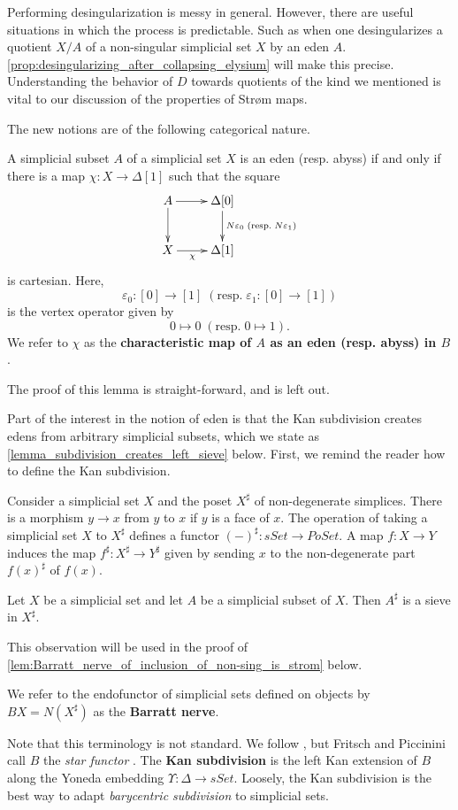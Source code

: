 Performing desingularization is messy in general. However, there are useful situations in which the process is predictable. Such as when one desingularizes a quotient $X/A$ of a non-singular simplicial set $X$ by an eden $A$. \cref{prop:desingularizing_after_collapsing_elysium} will make this precise. Understanding the behavior of $D$ towards quotients of the kind we mentioned is vital to our discussion of the properties of Str\o m maps.

The new notions are of the following categorical nature.
\begin{lemma}\label{lem:(co)sieve_characterization_categorical}
A simplicial subset $A$ of a simplicial set $X$ is an eden (resp. abyss) if and only if there is a map
$\chi :X\rightarrow \Delta [1]$ such that the square
\begin{displaymath}
 \xymatrix{
 A \ar[d] \ar[r] & \Delta [0] \ar[d]^{N\varepsilon _0\; (\textrm{resp.} \; N\varepsilon _1)} \\
 X \ar[r]_(.45)\chi & \Delta [1]
 }
\end{displaymath}
is cartesian. Here,
\[\varepsilon _0:[0]\to [1]\; (\textrm{resp.} \; \varepsilon _1:[0]\to [1])\]
is the vertex operator given by
\[0\mapsto 0\; (\textrm{resp.} \; 0\mapsto 1).\]
We refer to $\chi$ as the \textbf{characteristic map of $A$ as an eden (resp. abyss) in $B$}.
\end{lemma}
\noindent The proof of this lemma is straight-forward, and is left out.

Part of the interest in the notion of eden is that the Kan subdivision creates edens from arbitrary simplicial subsets, which we state as \cref{lemma_subdivision_creates_left_sieve} below. First, we remind the reader how to define the Kan subdivision.

Consider a simplicial set $X$ and the poset $X^\sharp$ of non-degenerate simplices. There is a morphism $y\to x$ from $y$ to $x$ if $y$ is a face of $x$. The operation of taking a simplicial set $X$ to $X^\sharp$ defines a functor $(-)^\sharp :sSet\to PoSet$.  A map $f:X\to Y$ induces the map $f^\sharp :X^\sharp \to Y^\sharp$ given by sending $x$ to the non-degenerate part $f(x)^\sharp$ of $f(x)$.
\begin{lemma}\label{lem:sharp_creates_sieves}
Let $X$ be a simplicial set and let $A$ be a simplicial subset of $X$. Then $A^\sharp$ is a sieve in $X^\sharp$.
\end{lemma}
\noindent This observation will be used in the proof of \cref{lem:Barratt_nerve_of_inclusion_of_non-sing_is_strom} below.
\begin{definition}\label{def:Barratt_nerve}
We refer to the endofunctor of simplicial sets defined on objects by $BX=N(X^\sharp )$ as the \textbf{Barratt nerve}.
\end{definition}
\noindent Note that this terminology is not standard. We follow \cite[Def.~2.2.3, p.~35]{WJR13}, but Fritsch and Piccinini call $B$ the \emph{star functor} \cite[Exercise~4.6.33,~p.~219]{FP90}. The \textbf{Kan subdivision} is the left Kan extension of $B$ along the Yoneda embedding $\Upsilon :\Delta \to sSet$. Loosely, the Kan subdivision is the best way to adapt \emph{barycentric subdivision} to simplicial sets.

